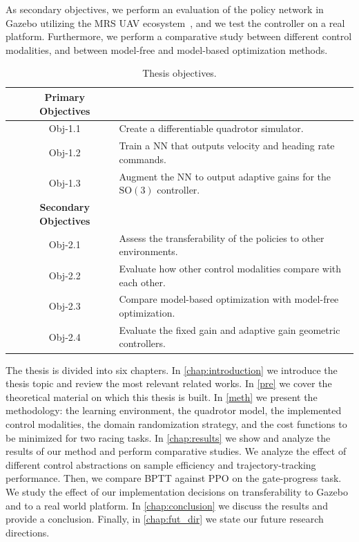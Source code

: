 As secondary objectives, we perform an evaluation of the policy network in Gazebo utilizing the MRS UAV ecosystem~\cite{baca_mrs_2021}, and we test the controller on a real platform.
Furthermore, we perform a comparative study between different control modalities, and between model-free and model-based optimization methods.
\begin{table}[ht]
\centering
\caption{Thesis objectives.}
\setlength{\arrayrulewidth}{1.1pt}
\begin{tabular}{|cc l|}
\hline
\rowcolor{blue!25} 
 \multicolumn{2}{|l}{} & \textbf{Primary Objectives} 
\\ \hline
\multicolumn{1}{|l}{} & Obj-1.1 & Create a differentiable quadrotor simulator.
\\ 
\multicolumn{1}{|l}{} & Obj-1.2 & Train a \ac{NN} that outputs velocity and heading rate commands. 
\\ 
\multicolumn{1}{|l}{} & Obj-1.3 & Augment the \ac{NN} to output adaptive gains for the $\mathrm{SO}(3)$ controller.                          \\ \hline

\rowcolor{blue!25} 
 \multicolumn{2}{|l}{} & \textbf{Secondary Objectives} 
\\ \hline
\multicolumn{1}{|l}{} & Obj-2.1 & Assess the transferability of the policies to other environments.  \\
\multicolumn{1}{|l}{} & Obj-2.2 & Evaluate how other control modalities compare with each other.                  \\
\multicolumn{1}{|l}{} & Obj-2.3 & Compare model-based optimization with model-free optimization. \\
\multicolumn{1}{|l}{} & Obj-2.4 & Evaluate the fixed gain and adaptive gain geometric controllers. 

\\ \hline

\end{tabular}
\label{KG}
\end{table}

The thesis is divided into six chapters.
In \autoref{chap:introduction} we introduce the thesis topic and review the most relevant related works.
In \autoref{pre} we cover the theoretical material on which this thesis is built.
In \autoref{meth} we present the methodology: the learning environment, the quadrotor model, the implemented control modalities, the domain randomization strategy, and the cost functions to be minimized for two racing tasks.
In \autoref{chap:results} we show and analyze the results of our method and perform comparative studies.
We analyze the effect of different control abstractions on sample efficiency and trajectory-tracking performance.
Then, we compare \ac{BPTT} against \ac{PPO} on the gate-progress task.
We study the effect of our implementation decisions on transferability to Gazebo and to a real world platform.
In \autoref{chap:conclusion} we discuss the results and provide a conclusion.
Finally, in \autoref{chap:fut_dir} we state our future research directions.

